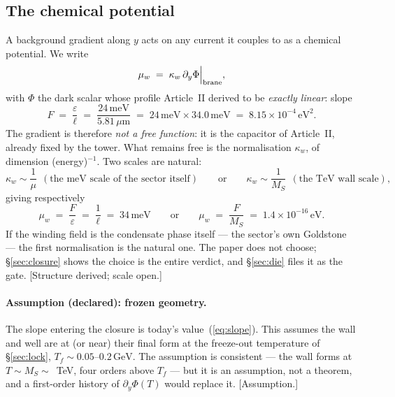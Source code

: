 \documentclass[11pt,a4paper]{article}
\newcommand{\meV}{\,\mathrm{meV}}
\newcommand{\GeV}{\,\mathrm{GeV}}
\newcommand{\eV}{\,\mathrm{eV}}
\begin{document}
\subsection{The chemical potential}
A background gradient along $y$ acts on any current it couples to as a
chemical potential. We write
\begin{equation}
\mu_w \;=\; \kappa_w\,\partial_y\Phi\Big|_{\rm brane},
\label{eq:muw}
\end{equation}
with $\Phi$ the dark scalar whose profile Article~II derived to be
\emph{exactly linear}: slope
\begin{equation}
F \;=\; \frac{\varepsilon}{\ell} \;=\;
\frac{24\meV}{5.81\,\mu\mathrm{m}}
\;=\; 24\meV\times34.0\meV \;=\; 8.15\times10^{-4}\eV^2 .
\label{eq:slope}
\end{equation}
The gradient is therefore \emph{not a free function}: it is the capacitor of
Article~II, already fixed by the tower. What remains free is the normalisation
$\kappa_w$, of dimension (energy)$^{-1}$. Two scales are natural:
\begin{equation}
\kappa_w \sim \frac{1}{\mu}\ \ (\text{the meV scale of the sector itself})
\qquad\text{or}\qquad
\kappa_w \sim \frac{1}{M_S}\ \ (\text{the TeV wall scale}),
\label{eq:branches}
\end{equation}
giving respectively
\begin{equation}
\mu_w \;=\; \frac{F}{\varepsilon} \;=\; \frac{1}{\ell} \;=\; 34\meV
\qquad\text{or}\qquad
\mu_w \;=\; \frac{F}{M_S} \;=\; 1.4\times10^{-16}\eV .
\label{eq:muw_values}
\end{equation}
If the winding field is the condensate phase itself --- the sector's own
Goldstone --- the first normalisation is the natural one. The paper does not
choose; \S\ref{sec:closure} shows the choice is the entire verdict, and
\S\ref{sec:die} files it as the gate. [Structure derived; scale open.]

\paragraph{Assumption (declared): frozen geometry.}
The slope entering the closure is today's value~(\ref{eq:slope}). This assumes
the wall and well are at (or near) their final form at the freeze-out
temperature of \S\ref{sec:lock}, $T_f\sim0.05$--$0.2\GeV$. The assumption is
consistent --- the wall forms at $T\sim M_S\sim$~TeV, four orders above $T_f$
--- but it is an assumption, not a theorem, and a first-order history of
$\partial_y\Phi(T)$ would replace it. [Assumption.]
\end{document}
